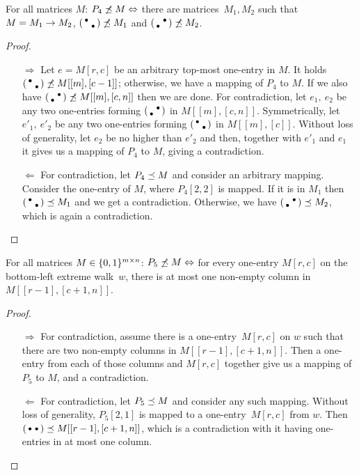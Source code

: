 \pagebreak
\begin{prop}
For all matrices $M$: $P_4\not\preceq M\Leftrightarrow$ there are matrices~$M_1,M_2$ such that  $M=M_1\rightarrow M_2$, $\left(\begin{smallmatrix}\bullet& \\ &\bullet\end{smallmatrix}\right)\not\preceq M_1$ and $\left(\begin{smallmatrix} &\bullet\\\bullet& \end{smallmatrix}\right)\not\preceq M_2$.
\end{prop}
\begin{proof}
\begin{itemize}
	\item[$\Rightarrow$] Let $e=M[r,c]$ be an arbitrary top-most one-entry in $M$. It holds $\left(\begin{smallmatrix}\bullet& \\ &\bullet\end{smallmatrix}\right)\not\preceq M[[m],[c-1]]$; otherwise, we have a mapping of $P_4$ to $M$. If we also have $\left(\begin{smallmatrix} &\bullet\\\bullet& \end{smallmatrix}\right)\not\preceq M[[m],[c,n]]$ then we are done. For contradiction, let $e_1,\ e_2$ be any two one-entries forming $\left(\begin{smallmatrix} &\bullet\\\bullet& \end{smallmatrix}\right)$ in $M[[m],[c,n]]$. Symmetrically, let $e'_1,\ e'_2$ be any two one-entries forming $\left(\begin{smallmatrix}\bullet& \\ &\bullet\end{smallmatrix}\right)$ in $M[[m],[c]]$. Without loss of generality, let $e_2$ be no higher than $e'_2$ and then, together with $e'_1$ and $e_1$ it gives us a mapping of $P_4$ to $M$, giving a contradiction. 
	\item[$\Leftarrow$] For contradiction, let $P_4\preceq M$ and consider an arbitrary mapping. Consider the one-entry of $M$, where $P_4[2,2]$ is mapped. If it is in $M_1$ then $\left(\begin{smallmatrix}\bullet& \\ &\bullet\end{smallmatrix}\right)\preceq M_1$ and we get a contradiction. Otherwise, we have $\left(\begin{smallmatrix} &\bullet\\\bullet& \end{smallmatrix}\right)\preceq M_2$, which is again a contradiction. \qedhere
\end{itemize}
\end{proof}

\begin{prop}
For all matrices $M\in\{0,1\}^{m\times n}$: $P_5\not\preceq M\Leftrightarrow$ for every one-entry $M[r,c]$ on the bottom-left extreme walk~$w$, there is at most one non-empty column in $M[[r-1],[c+1,n]]$.
\end{prop}
\begin{proof}
\begin{itemize}
	\item[$\Rightarrow$] For contradiction, assume there is a one-entry~$M[r,c]$ on $w$ such that there are two non-empty columns in $M[[r-1],[c+1,n]]$. Then a one-entry from each of those columns and $M[r,c]$ together give us a mapping of $P_5$ to $M$, and a contradiction. 
	\item[$\Leftarrow$] For contradiction, let $P_5\preceq M$ and consider any such mapping. Without loss of generality, $P_5[2,1]$ is mapped to a one-entry~$M[r,c]$ from $w$. Then $\left(\begin{smallmatrix}\bullet&\bullet\end{smallmatrix}\right)\preceq M[[r-1],[c+1,n]]$, which is a contradiction with it having one-entries in at most one column. \qedhere
\end{itemize}
\end{proof}

